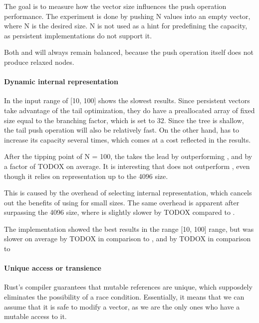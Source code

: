 The goal is to measure how the vector size influences the push operation performance. The experiment is done by pushing N values into an empty vector, where N is the desired size. N is not used as a hint for predefining the capacity, as persistent implementations do not support it. 

Both \rrbvec{} and \pvec{} will always remain balanced, because the push operation itself does not produce relaxed nodes.


\paragraph*{Dynamic internal representation}
In the input range of [10, 100] \stdvec{} shows the slowest results. Since persistent vectors take advantage of the tail optimization, they do have a preallocated array of fixed size equal to the branching factor, which is set to 32. Since the tree is shallow, the tail push operation will also be relatively fast. On the other hand, \stdvec{} has to increase its capacity several times, which comes at a cost reflected in the results. 

After the tipping point of N = 100, the \stdvec{} takes the lead by outperforming \pvec{}, \rrbvec{} and \imrsvec{} by a factor of TODOX on average. It is interesting that \pvec{} does not outperform \rrbvec{}, even though it relies on \stdvec{} representation up to the 4096 size. 

This is caused by the overhead of selecting internal representation, which cancels out the benefits of using \stdvec{} for small sizes. The same overhead is apparent after surpassing the 4096 size, where \pvec{} is slightly slower by TODOX compared to \rrbvec{}. 

The \imrsvec{} implementation showed the best results in the range [10, 100] range, but was slower on average by TODOX in comparison to \pvec{}, and by TODOX in comparison to \stdvec{}

\paragraph*{Unique access or transience}
Rust's compiler guarantees that mutable references are unique, which supposdely eliminates the possibility of a race condition. Essentially, it means that we can assume that it is safe to modify a vector, as we are the only ones who have a mutable access to it. 


